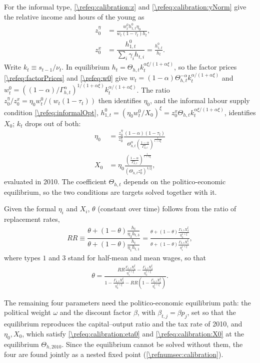 For the informal type, \eqref{\refeq:calibration:z} and \eqref{\refeq:calibration:yNorm} give the relative income and hours of the young as
\begin{align*}
    z_0^{\eta} &= \frac{w_t^0h_{1,t}^0\eta_{0}}{w_t(1-\tau_t)h_t}, \\
    z_0^x &= \dfrac{h_{1,t}^0}{\sum_i \gamma_{i} h_{t,i}} = \frac{h_{1,t}^0}{h_t}.
\end{align*}
Write $k_t\equiv s_{t-1}/\nu_t$. In equilibrium $h_t = \Theta_{h,t}k_t^{\alpha\xi/(1+\alpha\xi)}$, so the factor prices \eqref{\refeq:factorPrices} and \eqref{\refeq:w0} give $w_t = (1-\alpha)\Theta_{h,t}^{-\alpha}k_t^{\alpha/(1+\alpha\xi)}$ and $w_t^0 = \left((1-\alpha)/\Gamma_{h,t}^{\alpha}\right)^{1/(1+\alpha\xi)}k_t^{\alpha/(1+\alpha\xi)}$. The ratio $z_0^{\eta}/z_0^x = \eta_0w_t^0/\left(w_t(1-\tau_t)\right)$ then identifies $\eta_0$, and the informal labour supply condition \eqref{\refeq:informalOpt}, $h_{1,t}^0 = (\eta_0w_t^0/X_0)^{\xi} = z_0^x\Theta_{h,t}k_t^{\alpha\xi/(1+\alpha\xi)}$, identifies $X_0$; $k_t$ drops out of both:
\begin{align}
    \eta_{0} &= \frac{z_0^{\eta}}{z_0^x}\frac{(1-\alpha)(1-\tau_t)}{\Theta_{h,t}^{\alpha}\left(\frac{1-\alpha}{\Gamma_{h,t}^{\alpha}}\right)^{\frac{1}{1+\alpha\xi}}} \label{\refeq:calibration:eta0}\\
    X_{0} &= \eta_{0}\frac{\left(\frac{1-\alpha}{\Gamma_{h,t}^{\alpha}}\right)^{\frac{1}{1+\alpha\xi}}}{\left(\Theta_{h,t}z_0^x\right)^{1/\xi}}, \label{\refeq:calibration:X0}
\end{align}
evaluated in 2010. The coefficient $\Theta_{h,t}$ depends on the politico-economic equilibrium, so the two conditions are targets solved together with it.

Given the formal $\eta_i$ and $X_i$, $\theta$ (constant over time) follows from the ratio of replacement rates,
 \begin{align*}
        RR \equiv \dfrac{\theta+(1-\theta)\frac{h_t}{\eta_3 h_{t,3}}}{\theta+(1-\theta)\frac{h_t}{\eta_1 h_{t,1}}} = \frac{\theta + (1-\theta)\frac{\Gamma_{h,t} X_3^{\xi}}{\eta_3^{1+\xi}}}{\theta+(1-\theta)\frac{\Gamma_{h,t} X_1^{\xi}}{\eta_1^{1+\xi}}},
\end{align*}
where types $1$ and $3$ stand for half-mean and mean wages, so that
\begin{align}
    \theta = \frac{RR \frac{\Gamma_{h,t} X_1^{\xi}}{\eta_1^{1+\xi}} - \frac{\Gamma_{h,t} X_3^{\xi}}{\eta_3^{1+\xi}}}{1-\frac{\Gamma_{h,t} X_3^{\xi}}{\eta_3^{1+\xi}}-RR\left(1-\frac{\Gamma_{h,t} X_1^{\xi}}{\eta_1^{1+\xi}}\right)}.
\end{align}

The remaining four parameters need the politico-economic equilibrium path: the political weight $\omega$ and the discount factor $\beta$, with $\beta_{t,j} = \beta p_j$, set so that the equilibrium reproduces the capital--output ratio and the tax rate of 2010, and $\eta_0, X_0$, which satisfy \eqref{\refeq:calibration:eta0} and \eqref{\refeq:calibration:X0} at the equilibrium $\Theta_{h,2010}$. Since the equilibrium cannot be solved without them, the four are found jointly as a nested fixed point (\cref{\refnumsec:calibration}).
